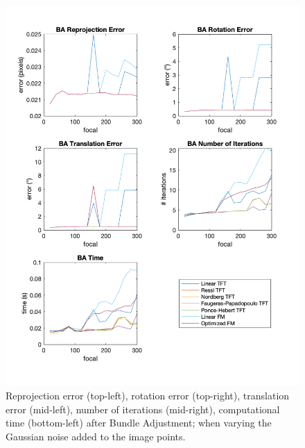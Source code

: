 \begin{figure}[p]
	\centering
	\includegraphics[width=1\textwidth]{Experiments/Synthetic/focal/BAfocalPlots.png}
	\caption{Reprojection error (top-left), rotation error (top-right), translation error (mid-left), number of iterations (mid-right), computational time (bottom-left) after Bundle Adjustment; when varying the Gaussian noise added to the image points.}
\end{figure}

